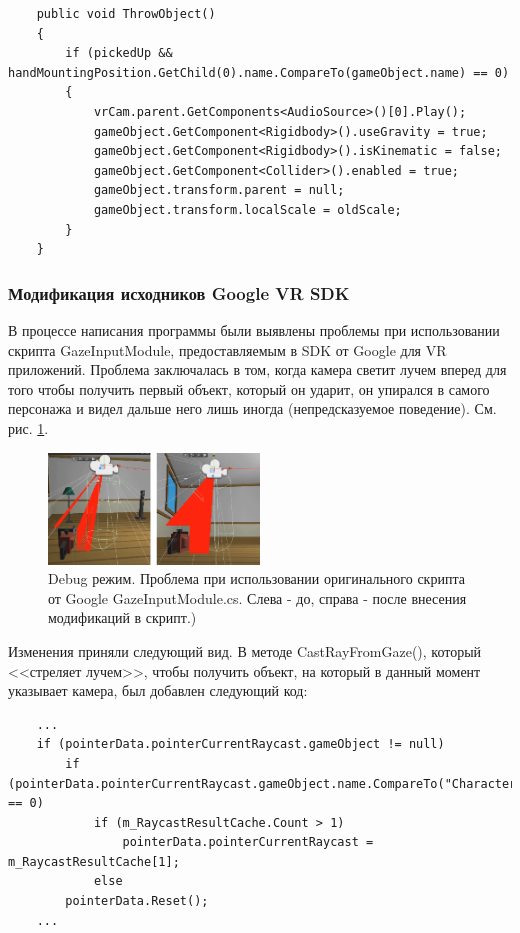 \begin{small}
    \begin{verbatim}
    public void ThrowObject()
    {
        if (pickedUp && handMountingPosition.GetChild(0).name.CompareTo(gameObject.name) == 0)
        {
            vrCam.parent.GetComponents<AudioSource>()[0].Play();
            gameObject.GetComponent<Rigidbody>().useGravity = true;
            gameObject.GetComponent<Rigidbody>().isKinematic = false;
            gameObject.GetComponent<Collider>().enabled = true;
            gameObject.transform.parent = null;
            gameObject.transform.localScale = oldScale;
        }
    }
    \end{verbatim}
\end{small}

\subsubsection{Модификация исходников Google VR SDK}

\tab[0.75cm]В процессе написания программы были выявлены проблемы при использовании скрипта GazeInputModule, предоставляемым в SDK от Google для VR приложений. Проблема заключалась в том, когда камера светит лучем вперед для того чтобы получить первый объект, который он ударит, он упирался в самого персонажа и видел дальше него лишь иногда (непредсказуемое поведение). См. рис. \ref{problem}.

\begin{figure}[h!]
    \centering
    \includegraphics[width=0.5\textwidth]{./screenshots/problem1.png}
    \caption{\small{Debug режим. Проблема при использовании оригинального скрипта от Google GazeInputModule.cs. Слева - до, справа - после внесения модификаций в скрипт.)}}
    \label{problem}
\end{figure} 


Изменения приняли следующий вид. В методе CastRayFromGaze(), который <<стреляет лучем>>, чтобы получить объект, на который в данный момент указывает камера, был добавлен следующий код:

\begin{small}
    \begin{verbatim}
    ...
    if (pointerData.pointerCurrentRaycast.gameObject != null)
        if (pointerData.pointerCurrentRaycast.gameObject.name.CompareTo("Character") == 0)
            if (m_RaycastResultCache.Count > 1)
                pointerData.pointerCurrentRaycast = m_RaycastResultCache[1];
            else
        pointerData.Reset();
    ...
    \end{verbatim}
\end{small}

